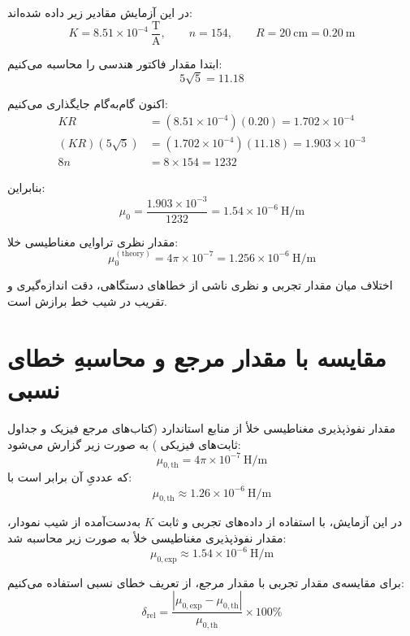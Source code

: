 \documentclass[a4paper, 11pt]{article}
\begin{document}
در این آزمایش مقادیر زیر داده شده‌اند:
\[
K = 8.51\times 10^{-4}\ \frac{\mathrm{T}}{\mathrm{A}}, \qquad
n = 154, \qquad
R = 20\ \mathrm{cm} = 0.20\ \mathrm{m}
\]

ابتدا مقدار فاکتور هندسی را محاسبه می‌کنیم:
\[
5\sqrt{5} = 11.18
\]

اکنون گام‌به‌گام جایگذاری می‌کنیم:
\begin{align}
K R &= (8.51\times 10^{-4})(0.20)
     = 1.702\times 10^{-4} \\[6pt]
(KR)(5\sqrt{5}) &= (1.702\times 10^{-4})(11.18)
               = 1.903\times 10^{-3} \\[6pt]
8n &= 8 \times 154 = 1232
\end{align}

بنابراین:
\begin{equation}
\mu_0 = \frac{1.903\times 10^{-3}}{1232}
      = 1.54\times 10^{-6}\ \mathrm{H/m}
\end{equation}


مقدار نظری تراوایی مغناطیسی خلا:
\[
\mu_0^{(\mathrm{theory})} = 4\pi \times 10^{-7}
= 1.256\times 10^{-6}\ \mathrm{H/m}
\]

اختلاف میان مقدار تجربی و نظری ناشی از خطاهای دستگاهی، دقت اندازه‌گیری و تقریب در شیب خط برازش است.

\section*{مقایسه با مقدار مرجع و محاسبهِ خطای نسبی}

مقدار نفوذپذیری مغناطیسی خلأ از منابع استاندارد (کتاب‌های مرجع فیزیک\cite{feynman1964}
 و جداول ثابت‌های فیزیکی\cite{codata2018}
) به صورت زیر گزارش می‌شود:
\begin{equation}
\mu_{0,\mathrm{th}} = 4\pi \times 10^{-7}\ \mathrm{H/m}
\end{equation}
که عددیِ آن برابر است با:
\begin{equation}
\mu_{0,\mathrm{th}} \approx 1.26 \times 10^{-6}\ \mathrm{H/m}
\end{equation}

در این آزمایش، با استفاده از داده‌های تجربی و ثابت \(K\) به‌دست‌آمده از شیب نمودار، مقدار نفوذپذیری مغناطیسی خلأ به صورت زیر محاسبه شد:
\begin{equation}
\mu_{0,\mathrm{exp}} \approx 1.54 \times 10^{-6}\ \mathrm{H/m}
\end{equation}

برای مقایسه‌ی مقدار تجربی با مقدار مرجع، از تعریف خطای نسبی استفاده می‌کنیم:
\begin{equation}
\delta_{\mathrm{rel}} = \frac{|\mu_{0,\mathrm{exp}} - \mu_{0,\mathrm{th}}|}{\mu_{0,\mathrm{th}}} \times 100\%
\end{equation}
\end{document}

